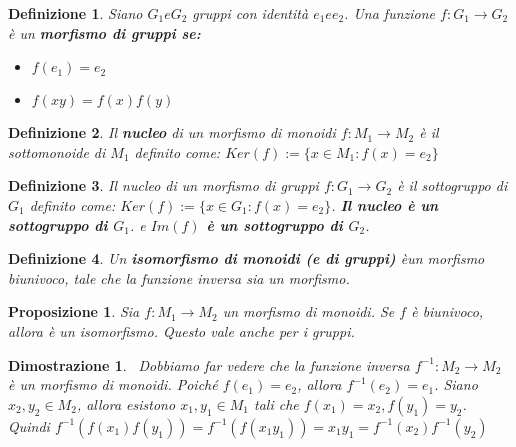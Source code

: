 \documentclass[a4paper,12pt]{article}
\theoremstyle{def}
\newtheorem*{definition}{Definizione}
\theoremstyle{prop}
\newtheorem*{proposition}{Proposizione}
\theoremstyle{esempio}
\theoremstyle{dimostrazione}
\newtheorem*{dimostrazione}{Dimostrazione}
\theoremstyle{teo}
\theoremstyle{osservazione}
\begin{document}
\begin{definition}
	Siano \(G_1 e G_2\) gruppi con identità \(e_1 e e_2\). Una funzione \(f : G_1 \rightarrow G_2\) è un
	\textbf{morfismo di gruppi se:}
	\
	\begin{itemize}
		\item \(f(e_1) = e_2\)
		\item \(f(xy) = f(x)f(y)\)
	\end{itemize}
\end{definition}


\begin{definition}
	Il \textbf{nucleo} di un morfismo di monoidi \(f: M_1 \rightarrow M_2\) è il sottomonoide di \(M_1\)
	definito come: \(Ker(f):= \{x \in M_1 : f(x) = e_2\}\)
\end{definition}

\begin{definition}
	Il nucleo di un morfismo di gruppi \(f: G_1 \rightarrow G_2\) è il sottogruppo di \(G_1\) definito
	come: \(Ker(f):= \{x \in G_1 : f(x) = e_2\}\). \textbf{Il nucleo è un sottogruppo di \(G_1\)}. e
	\textbf{\(Im(f)\) è un sottogruppo di \(G_2\)}.
\end{definition}

\begin{definition}
	Un \textbf{isomorfismo di monoidi (e di gruppi)} èun morfismo biunivoco, tale che la funzione inversa sia un morfismo.
\end{definition}


\begin{proposition}
	Sia \(f: M_1 \rightarrow M_2\) un morfismo di monoidi. Se \(f\) è biunivoco, allora è un isomorfismo.
	Questo vale anche per i gruppi.
\end{proposition}


\begin{dimostrazione}
	\
	Dobbiamo far vedere che la funzione inversa \(f^{-1} : M_2 \rightarrow M_2\) è un morfismo di monoidi.
	Poiché \(f(e_1) = e_2\), allora \(f^{-1}(e_2) = e_1\). Siano \(x_2,y_2 \in M_2\), allora esistono
	\(x_1,y_1 \in M_1\) tali che \(f(x_1)=x_2 , f(y_1)=y_2\). Quindi \(f^{-1} (f(x_1)f(y_1)) = f^{-1}(f(x_1 y_1))
	= x_1 y_1 = f^{-1}(x_2) f^{-1}(y_2)\)
\end{dimostrazione}
\end{document}

